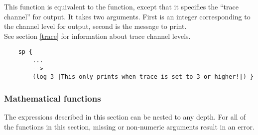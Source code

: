 \begin{description}


\item [\soarb{log} --- ] 
	This function is equivalent to the  function, except that it specifies the ``trace channel'' for output. It takes two arguments. First is an integer corresponding to the channel level for output, second is the message to print. \\
	See section \ref{trace} for information about trace channel levels.

	\begin{verbatim}
	sp {
		...
		-->
		(log 3 |This only prints when trace is set to 3 or higher!|) }
	\end{verbatim}

\end{description}

\subdivider
\subsubsection*{Mathematical functions}

The expressions described in this section can be nested to any depth. For all of the functions in this section, missing or non-numeric arguments result in an error.


